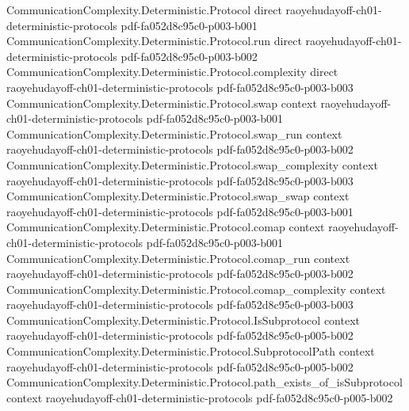 \begin{lemma}
\label{CommunicationComplexity.Deterministic.Protocol.aux_isRectangle}
\leanok
{}
\proofstep
  {CommunicationComplexity.Deterministic.Protocol}
  {direct}
  {raoyehudayoff-ch01-deterministic-protocols}
  {pdf-fa052d8c95c0-p003-b001}
\proofstep
  {CommunicationComplexity.Deterministic.Protocol.run}
  {direct}
  {raoyehudayoff-ch01-deterministic-protocols}
  {pdf-fa052d8c95c0-p003-b002}
\proofstep
  {CommunicationComplexity.Deterministic.Protocol.complexity}
  {direct}
  {raoyehudayoff-ch01-deterministic-protocols}
  {pdf-fa052d8c95c0-p003-b003}
\proofstep
  {CommunicationComplexity.Deterministic.Protocol.swap}
  {context}
  {raoyehudayoff-ch01-deterministic-protocols}
  {pdf-fa052d8c95c0-p003-b001}
\proofstep
  {CommunicationComplexity.Deterministic.Protocol.swap_run}
  {context}
  {raoyehudayoff-ch01-deterministic-protocols}
  {pdf-fa052d8c95c0-p003-b002}
\proofstep
  {CommunicationComplexity.Deterministic.Protocol.swap_complexity}
  {context}
  {raoyehudayoff-ch01-deterministic-protocols}
  {pdf-fa052d8c95c0-p003-b003}
\proofstep
  {CommunicationComplexity.Deterministic.Protocol.swap_swap}
  {context}
  {raoyehudayoff-ch01-deterministic-protocols}
  {pdf-fa052d8c95c0-p003-b001}
\proofstep
  {CommunicationComplexity.Deterministic.Protocol.comap}
  {context}
  {raoyehudayoff-ch01-deterministic-protocols}
  {pdf-fa052d8c95c0-p003-b001}
\proofstep
  {CommunicationComplexity.Deterministic.Protocol.comap_run}
  {context}
  {raoyehudayoff-ch01-deterministic-protocols}
  {pdf-fa052d8c95c0-p003-b002}
\proofstep
  {CommunicationComplexity.Deterministic.Protocol.comap_complexity}
  {context}
  {raoyehudayoff-ch01-deterministic-protocols}
  {pdf-fa052d8c95c0-p003-b003}
\proofstep
  {CommunicationComplexity.Deterministic.Protocol.IsSubprotocol}
  {context}
  {raoyehudayoff-ch01-deterministic-protocols}
  {pdf-fa052d8c95c0-p005-b002}
\proofstep
  {CommunicationComplexity.Deterministic.Protocol.SubprotocolPath}
  {context}
  {raoyehudayoff-ch01-deterministic-protocols}
  {pdf-fa052d8c95c0-p005-b002}
\proofstep
  {CommunicationComplexity.Deterministic.Protocol.path_exists_of_isSubprotocol}
  {context}
  {raoyehudayoff-ch01-deterministic-protocols}
  {pdf-fa052d8c95c0-p005-b002}

\end{lemma}
